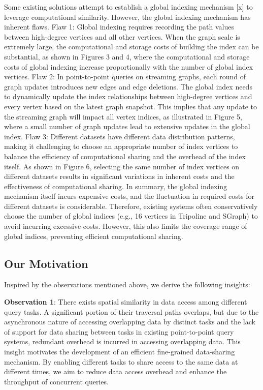 \documentclass[lettersize,journal]{IEEEtran} %
\begin{document}
Some existing solutions attempt to establish a global indexing mechanism [x] to leverage computational similarity. However, the global indexing mechanism has inherent flaws. Flaw 1: Global indexing requires recording the path values between high-degree vertices and all other vertices. When the graph scale is extremely large, the computational and storage costs of building the index can be substantial, as shown in Figures 3 and 4, where the computational and storage costs of global indexing increase proportionally with the number of global index vertices. Flaw 2: In point-to-point queries on streaming graphs, each round of graph updates introduces new edges and edge deletions. The global index needs to dynamically update the index relationships between high-degree vertices and every vertex based on the latest graph snapshot. This implies that any update to the streaming graph will impact all vertex indices, as illustrated in Figure 5, where a small number of graph updates lead to extensive updates in the global index. Flaw 3: Different datasets have different data distribution patterns, making it challenging to choose an appropriate number of index vertices to balance the efficiency of computational sharing and the overhead of the index itself. As shown in Figure 6, selecting the same number of index vertices on different datasets results in significant variations in inherent costs and the effectiveness of computational sharing. In summary, the global indexing mechanism itself incurs expensive costs, and the fluctuation in required costs for different datasets is considerable. Therefore, existing systems often conservatively choose the number of global indices (e.g., 16 vertices in Tripoline and SGraph) to avoid incurring excessive costs. However, this also limits the coverage range of global indices, preventing efficient computational sharing. 



\subsection{Our Motivation}
Inspired by the observations mentioned above, we derive the following insights:

{\bf{Observation 1}}: There exists spatial similarity in data access among different query tasks. A significant portion of their traversal paths overlaps, but due to the asynchronous nature of accessing overlapping data by distinct tasks and the lack of support for data sharing between tasks in existing point-to-point query systems, redundant overhead is incurred in accessing overlapping data. This insight motivates the development of an efficient fine-grained data-sharing mechanism. By enabling different tasks to share access to the same data at different times, we aim to reduce data access overhead and enhance the throughput of concurrent queries.
\end{document}
